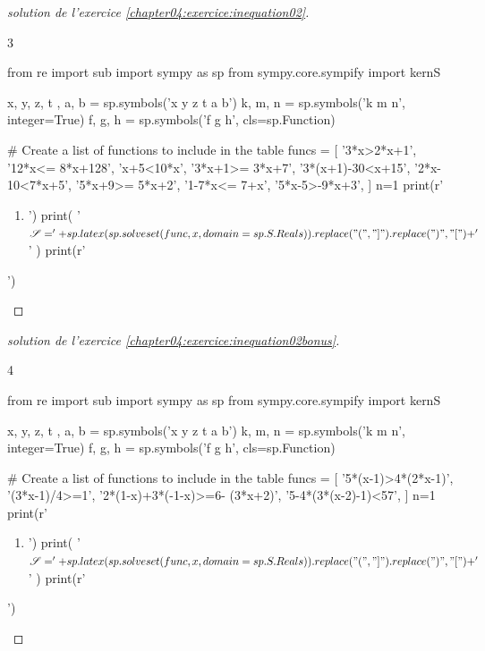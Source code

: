 \documentclass[main.tex]{subfiles}
\begin{document}
\begin{proof} [solution de l'exercice  \ref{chapter04:exercice:inequation02}]\hfill
	\vspace{-0.75em}
\begin{multicols}{3} 
\begin{pycode}
from re import sub
import sympy as sp
from sympy.core.sympify import kernS

x, y, z, t , a, b = sp.symbols('x y z t a b')
k, m, n = sp.symbols('k m n', integer=True)
f, g, h = sp.symbols('f g h', cls=sp.Function)

# Create a list of functions to include in the table
funcs = [
'3*x>2*x+1', 
'12*x<= 8*x+128',
'x+5<10*x',  
'3*x+1>= 3*x+7',
'3*(x+1)-30<x+15',
'2*x-10<7*x+5', 
'5*x+9>= 5*x+2',
'1-7*x<= 7+x',
'5*x-5>-9*x+3',
]
n=1
print(r'\begin{enumerate}[label={$(I_{\arabic*})$}] ')
for func in funcs:
	print('\item ')
	print( '$\mathscr{S}  = ' + sp.latex(sp.solveset(func,   x,   domain=sp.S.Reals)).replace("(", "]").replace(")", "[")   + '$'     )
print(r'\end{enumerate}  ')
\end{pycode}
\end{multicols}	
\scriptsize
\end{proof}  
\vspace{-1em}
\begin{proof} [solution de l'exercice  \ref{chapter04:exercice:inequation02bonus}]\hfill 
	\vspace{-0.75em}
\begin{multicols}{4} 
\begin{pycode}
from re import sub
import sympy as sp
from sympy.core.sympify import kernS

x, y, z, t , a, b = sp.symbols('x y z t a b')
k, m, n = sp.symbols('k m n', integer=True)
f, g, h = sp.symbols('f g h', cls=sp.Function)

# Create a list of functions to include in the table
funcs = [
'5*(x-1)>4*(2*x-1)', 
'(3*x-1)/4>=1', 
'2*(1-x)+3*(-1-x)>=6- (3*x+2)', 
'5-4*(3*(x-2)-1)<57',  
]
n=1
print(r'\begin{enumerate}[label={$(I_{\arabic*})$}] ')
for func in funcs:
	print('\item ')
	print( '$\mathscr{S}  = ' + sp.latex(sp.solveset(func,   x,   domain=sp.S.Reals)).replace("(", "]").replace(")", "[")   + '$'     )
print(r'\end{enumerate}  ')
\end{pycode}
\end{multicols}	
\scriptsize
\end{proof} 
\end{document}
